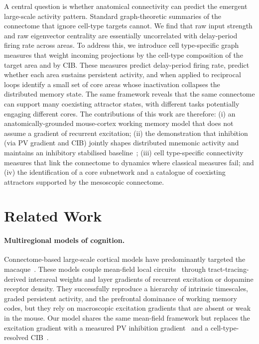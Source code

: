 A central question is whether anatomical connectivity can predict the emergent large-scale activity pattern. Standard graph-theoretic summaries of the connectome that ignore cell-type targets cannot. We find that raw input strength and raw eigenvector centrality are essentially uncorrelated with delay-period firing rate across areas. To address this, we introduce cell type-specific graph measures that weight incoming projections by the cell-type composition of the target area and by CIB. These measures predict delay-period firing rate, predict whether each area sustains persistent activity, and when applied to reciprocal loops identify a small set of core areas whose inactivation collapses the distributed memory state. The same framework reveals that the same connectome can support many coexisting attractor states, with different tasks potentially engaging different cores. The contributions of this work are therefore: (i) an anatomically-grounded mouse-cortex working memory model that does not assume a gradient of recurrent excitation; (ii) the demonstration that inhibition (via PV gradient and CIB) jointly shapes distributed mnemonic activity and maintains an inhibitory stabilised baseline~\cite{tsodyks1997paradoxical,sanzeni2020inhibition}; (iii) cell type-specific connectivity measures that link the connectome to dynamics where classical measures fail; and (iv) the identification of a core subnetwork and a catalogue of coexisting attractors supported by the mesoscopic connectome.

\section{Related Work}

\paragraph{Multiregional models of cognition.}
Connectome-based large-scale cortical models have predominantly targeted the macaque~\cite{murray2014hierarchy,mejias2022mechanisms,froudistwalsh2021dopamine}. These models couple mean-field local circuits~\cite{wang2002probabilistic,wongwang2006recurrent} through tract-tracing-derived interareal weights and layer gradients of recurrent excitation or dopamine receptor density. They successfully reproduce a hierarchy of intrinsic timescales, graded persistent activity, and the prefrontal dominance of working memory codes, but they rely on macroscopic excitation gradients that are absent or weak in the mouse. Our model shares the same mean-field framework but replaces the excitation gradient with a measured PV inhibition gradient~\cite{kim2017braintype} and a cell-type-resolved CIB~\cite{mejias2022mechanisms,wang2020macroscopic}.

